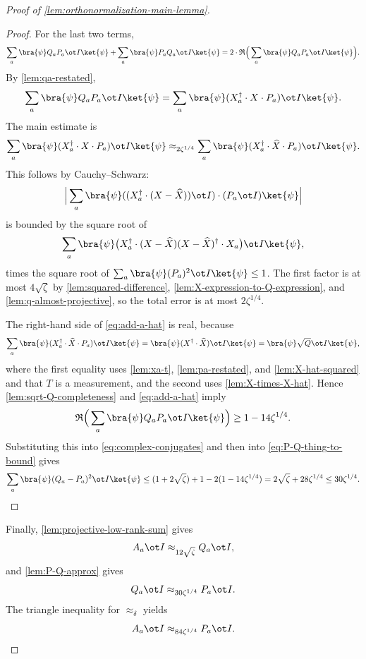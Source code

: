 \begin{proof}[Proof of \ref{lem:orthonormalization-main-lemma}]
\begin{proof}
		For the last two terms,
		\begin{equation}\label{eq:complex-conjugates}
			\sum_a \bra{\psi} Q_aP_a \ot I \ket{\psi}
			+
			\sum_a \bra{\psi} P_aQ_a \ot I \ket{\psi}
			=
			2 \cdot \mathfrak{R}\Big(\sum_a \bra{\psi} Q_aP_a \ot I \ket{\psi}\Big).
		\end{equation}
		By \ref{lem:qa-restated},
		\[
			\sum_a \bra{\psi} Q_aP_a \ot I \ket{\psi}
			=
			\sum_a \bra{\psi} (X_a^\dagger \cdot X \cdot P_a) \ot I \ket{\psi}.
		\]
		The main estimate is
		\begin{equation}\label{eq:add-a-hat}
			\sum_a \bra{\psi} (X_a^\dagger \cdot X \cdot P_a)\ot I \ket{\psi}
			\approx_{2\zeta^{1/4}}
			\sum_a \bra{\psi} (X_a^\dagger \cdot \widehat{X} \cdot P_a)\ot I \ket{\psi}.
		\end{equation}
		This follows by Cauchy--Schwarz:
		\[
			\Big|\sum_a \bra{\psi} ((X_a^\dagger \cdot (X-\widehat X)) \ot I)\cdot(P_a \ot I)\ket{\psi}\Big|
		\]
		is bounded by the square root of
		\[
			\sum_a \bra{\psi} \big(X_a^\dagger \cdot (X-\widehat X)(X-\widehat X)^\dagger \cdot X_a\big)\ot I \ket{\psi},
		\]
		times the square root of $\sum_a \bra{\psi}(P_a)^2 \ot I \ket{\psi} \leq 1$. The first factor is at most $4\sqrt{\zeta}$ by \ref{lem:squared-difference}, \ref{lem:X-expression-to-Q-expression}, and \ref{lem:q-almost-projective}, so the total error is at most $2\zeta^{1/4}$.

		The right-hand side of \ref{eq:add-a-hat} is real, because
		\[
			\sum_a \bra{\psi} (X_a^\dagger \cdot \widehat{X} \cdot P_a)\ot I \ket{\psi}
			=
			\bra{\psi} (X^\dagger \cdot \widehat{X}) \ot I \ket{\psi}
			=
			\bra{\psi} \sqrt{Q} \ot I \ket{\psi},
		\]
		where the first equality uses \ref{lem:xa-t}, \ref{lem:pa-restated}, and \ref{lem:X-hat-squared} and that $T$ is a measurement, and the second uses \ref{lem:X-times-X-hat}. Hence \ref{lem:sqrt-Q-completeness} and \ref{eq:add-a-hat} imply
		\[
			\mathfrak{R}\Big(\sum_a \bra{\psi} Q_aP_a \ot I \ket{\psi}\Big)
			\geq
			1-14\zeta^{1/4}.
		\]
		Substituting this into \ref{eq:complex-conjugates} and then into \ref{eq:P-Q-thing-to-bound} gives
		\[
			\sum_a \bra{\psi} (Q_a-P_a)^2 \ot I \ket{\psi}
			\leq
			(1+2\sqrt{\zeta}) + 1 - 2(1-14\zeta^{1/4})
			=
			2\sqrt{\zeta} + 28\zeta^{1/4}
			\leq
			30\zeta^{1/4}.
		\]
	\end{proof}

	Finally, \ref{lem:projective-low-rank-sum} gives
	\[
		A_a \ot I \approx_{12\sqrt{\zeta}} Q_a \ot I,
	\]
	and \ref{lem:P-Q-approx} gives
	\[
		Q_a \ot I \approx_{30\zeta^{1/4}} P_a \ot I.
	\]
	The triangle inequality for $\approx_\delta$ yields
	\[
		A_a \ot I \approx_{84\zeta^{1/4}} P_a \ot I.
	\]
\end{proof}


